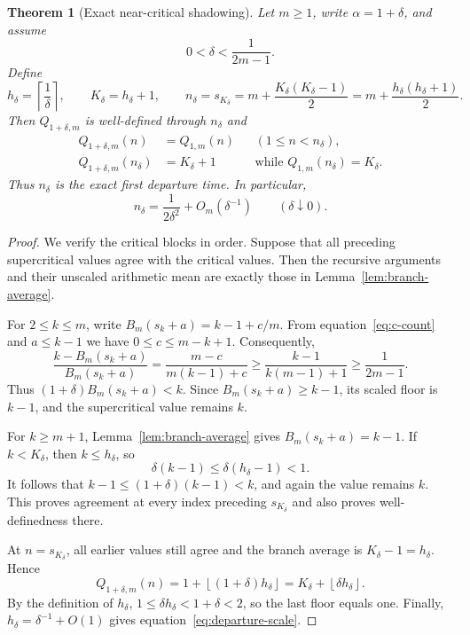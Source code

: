 \documentclass[11pt]{article}
\newtheorem{theorem}{Theorem}[section]
\theoremstyle{definition}
\theoremstyle{remark}
\newcommand{\floor}[1]{\left\lfloor #1\right\rfloor}
\begin{document}
\begin{theorem}[Exact near-critical shadowing]\label{thm:shadowing}
Let $m\ge1$, write $\alpha=1+\delta$, and assume
\begin{equation}\label{eq:delta-small}
0<\delta<\frac{1}{2m-1}.
\end{equation}
Define
\begin{equation}\label{eq:departure-block}
h_\delta=\left\lceil\frac1\delta\right\rceil,
\qquad
K_\delta=h_\delta+1,
\qquad
n_\delta=s_{K_\delta}
=m+\frac{K_\delta(K_\delta-1)}2
=m+\frac{h_\delta(h_\delta+1)}2.
\end{equation}
Then $Q_{1+\delta,m}$ is well-defined through $n_\delta$ and
\begin{align}
Q_{1+\delta,m}(n)&=Q_{1,m}(n)
&& (1\le n<n_\delta),\label{eq:shadow-equality}\\
Q_{1+\delta,m}(n_\delta)&=K_\delta+1
&&\text{while }Q_{1,m}(n_\delta)=K_\delta.
\label{eq:first-departure}
\end{align}
Thus $n_\delta$ is the exact first departure time.  In particular,
\begin{equation}\label{eq:departure-scale}
n_\delta
=
\frac{1}{2\delta^2}+O_m(\delta^{-1})
\qquad (\delta\downarrow0).
\end{equation}
\end{theorem}

\begin{proof}
We verify the critical blocks in order.  Suppose that all preceding
supercritical values agree with the critical values.  Then the recursive
arguments and their unscaled arithmetic mean are exactly those in
Lemma~\ref{lem:branch-average}.

For $2\le k\le m$, write $B_m(s_k+a)=k-1+c/m$.  From
equation~\eqref{eq:c-count} and $a\le k-1$ we have
$0\le c\le m-k+1$.  Consequently,
\begin{equation}\label{eq:early-margin}
\frac{k-B_m(s_k+a)}{B_m(s_k+a)}
=
\frac{m-c}{m(k-1)+c}
\ge
\frac{k-1}{k(m-1)+1}
\ge
\frac1{2m-1}.
\end{equation}
Thus $(1+\delta)B_m(s_k+a)<k$.  Since
$B_m(s_k+a)\ge k-1$, its scaled floor is $k-1$, and the supercritical value
remains $k$.

For $k\ge m+1$, Lemma~\ref{lem:branch-average} gives
$B_m(s_k+a)=k-1$.  If $k<K_\delta$, then $k\le h_\delta$, so
\[
\delta(k-1)\le\delta(h_\delta-1)<1.
\]
It follows that $k-1\le(1+\delta)(k-1)<k$, and again the value remains $k$.
This proves agreement at every index preceding $s_{K_\delta}$ and also
proves well-definedness there.

At $n=s_{K_\delta}$, all earlier values still agree and the branch average
is $K_\delta-1=h_\delta$.  Hence
\[
Q_{1+\delta,m}(n)
=1+\floor{(1+\delta)h_\delta}
=K_\delta+\floor{\delta h_\delta}.
\]
By the definition of $h_\delta$,
$1\le\delta h_\delta<1+\delta<2$, so the last floor equals one.  Finally,
$h_\delta=\delta^{-1}+O(1)$ gives
equation~\eqref{eq:departure-scale}.
\end{proof}
\end{document}
